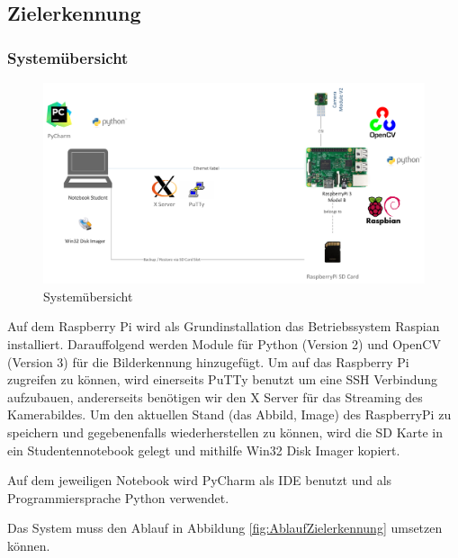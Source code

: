 \documentclass[a4paper]{report}
\begin{document}
\newpage
\subsection{Zielerkennung}
\subsubsection{Systemübersicht}

\begin{figure}[h!]
	\includegraphics[keepaspectratio,width=\textwidth]{TargetRecOS}
	\caption{Systemübersicht}
	\label{fig:Systemuebersicht}
\end{figure}

Auf dem Raspberry Pi wird als Grundinstallation das Betriebssystem Raspian installiert. Darauffolgend werden Module für Python (Version 2) und OpenCV (Version 3) für die Bilderkennung hinzugefügt.
Um auf das Raspberry Pi zugreifen zu können, wird einerseits PuTTy benutzt um eine SSH Verbindung aufzubauen, andererseits benötigen wir den X Server für das Streaming des Kamerabildes.
Um den aktuellen Stand (das Abbild, Image) des RaspberryPi zu speichern und gegebenenfalls wiederherstellen zu können, wird die SD Karte in ein Studentennotebook gelegt und mithilfe Win32 Disk Imager kopiert.

Auf dem jeweiligen Notebook wird PyCharm als IDE benutzt und als Programmiersprache Python verwendet.

Das System muss den Ablauf in Abbildung \ref{fig:AblaufZielerkennung} umsetzen können.
\end{document}
